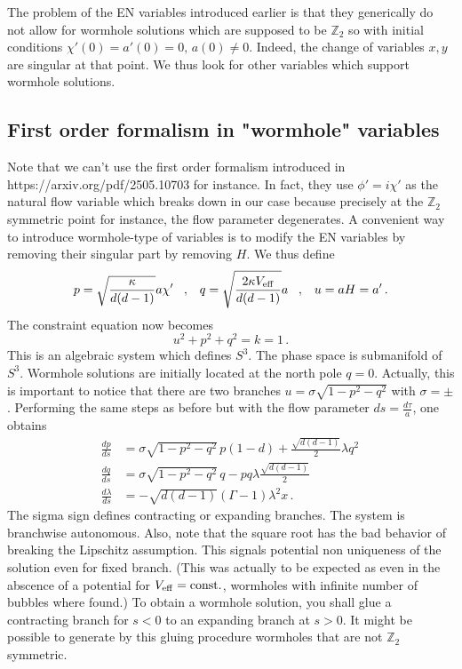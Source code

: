 \documentclass[a4paper]{article}
\def\sp{\;\;\;,\;\;\;}
\begin{document}
The problem of the EN variables introduced earlier is that they generically do not allow for wormhole solutions which are supposed to be $\mathbb{Z}_2$ so with initial conditions $\chi'(0) = a'(0) = 0,\,a(0)\neq 0$. Indeed, the change of variables $x,y$ are singular at that point. We thus look for other variables which support wormhole solutions.

\subsection{First order formalism in "wormhole" variables}
Note that we can't use the first order formalism introduced in https://arxiv.org/pdf/2505.10703 for instance. In fact, they use $\phi' = i\chi'$ as the natural flow variable which breaks down in our case because precisely at the $\mathbb{Z}_2$ symmetric point for instance, the flow parameter degenerates. A convenient way to introduce wormhole-type of variables is to modify the EN variables by removing their singular part by removing $H$. We thus define
\begin{equation}
  p =\sqrt{\frac{\kappa}{d(d-1)}}a\chi' \sp q = \sqrt{\frac{2\kappa V_{\rm eff}}{d(d-1)}}a \sp u = aH = a'\,.
\end{equation}
The constraint equation now becomes
\begin{equation}
  u^2 + p^2 + q^2 =k=1\,.
\end{equation}
This is an algebraic system which defines $S^3$. The phase space is submanifold of $S^3$. Wormhole solutions are initially located at the north pole $q=0$. Actually, this is important to notice that there are two branches $u = \sigma\sqrt{1-p^2-q^2}$ with $\sigma = \pm$. Performing the same steps as before but with the flow parameter $ds=\frac{d\tau}{a}$, one obtains
\begin{equation}
  \begin{aligned}
    \frac{dp}{ds}&=\sigma\sqrt{1-p^2-q^2} \,p (1-d)+\frac{\sqrt{d(d-1)}}{2}\lambda q^2\,\\
    \frac{dq}{ds}&=\sigma\sqrt{1-p^2-q^2}\,q -p q \lambda \frac{\sqrt{d(d-1)}}{2}\,\\
    \frac{d\lambda}{ds}&=-\sqrt{d(d-1)}\left(\Gamma-1\right)\lambda^2 x\,.
  \end{aligned}
\end{equation}
The sigma sign defines contracting or expanding branches. The system is branchwise autonomous. Also, note that the square root has the bad behavior of breaking the Lipschitz assumption. This signals potential non uniqueness of the solution even for fixed branch. (This was actually to be expected as even in the abscence of a potential for $V_{\rm eff}=\rm const.$, wormholes with infinite number of bubbles where found.) To obtain a wormhole solution, you shall glue a contracting branch for $s<0$ to an expanding branch at $s>0$. It might be possible to generate by this gluing procedure wormholes that are not $\mathbb{Z}_2$ symmetric.
\end{document}
